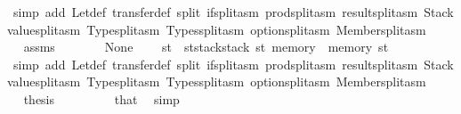 \begin{isabellebody}
\ {\isacharparenleft}{\kern0pt}simp\ add{\isacharcolon}{\kern0pt}\ Let{\isacharunderscore}{\kern0pt}def\ transfer{\isacharunderscore}{\kern0pt}def\ split{\isacharcolon}{\kern0pt}\ if{\isacharunderscore}{\kern0pt}split{\isacharunderscore}{\kern0pt}asm\ prod{\isachardot}{\kern0pt}split{\isacharunderscore}{\kern0pt}asm\ result{\isachardot}{\kern0pt}split{\isacharunderscore}{\kern0pt}asm\ Stackvalue{\isachardot}{\kern0pt}split{\isacharunderscore}{\kern0pt}asm\ Type{\isachardot}{\kern0pt}split{\isacharunderscore}{\kern0pt}asm\ Types{\isachardot}{\kern0pt}split{\isacharunderscore}{\kern0pt}asm\ option{\isachardot}{\kern0pt}split{\isacharunderscore}{\kern0pt}asm\ Member{\isachardot}{\kern0pt}split{\isacharunderscore}{\kern0pt}asm{\isacharparenright}{\kern0pt}\isanewline
\ \ \ \ \isamarkupfalse%
\ \isamarkupfalse%
\ assms\ {}\ {}\ {}\ {}\ {}\ {}\ {}\ None\ {}\ {}\ \isamarkupfalse%
\ {\isachardoublequoteopen}st{\isacharprime}{\kern0pt}\ {\isacharequal}{\kern0pt}\ st{\isacharprime}{\kern0pt}{\isacharprime}{\kern0pt}{\isasymlparr}stack{\isacharcolon}{\kern0pt}{\isacharequal}{\kern0pt}stack\ st{\isacharcomma}{\kern0pt}\ memory\ {\isacharcolon}{\kern0pt}{\isacharequal}{\kern0pt}\ memory\ st{\isasymrparr}{\isachardoublequoteclose}\ \isamarkupfalse%
\ {\isacharparenleft}{\kern0pt}simp\ add{\isacharcolon}{\kern0pt}\ Let{\isacharunderscore}{\kern0pt}def\ transfer{\isacharunderscore}{\kern0pt}def\ split{\isacharcolon}{\kern0pt}\ if{\isacharunderscore}{\kern0pt}split{\isacharunderscore}{\kern0pt}asm\ prod{\isachardot}{\kern0pt}split{\isacharunderscore}{\kern0pt}asm\ result{\isachardot}{\kern0pt}split{\isacharunderscore}{\kern0pt}asm\ Stackvalue{\isachardot}{\kern0pt}split{\isacharunderscore}{\kern0pt}asm\ Type{\isachardot}{\kern0pt}split{\isacharunderscore}{\kern0pt}asm\ Types{\isachardot}{\kern0pt}split{\isacharunderscore}{\kern0pt}asm\ option{\isachardot}{\kern0pt}split{\isacharunderscore}{\kern0pt}asm\ Member{\isachardot}{\kern0pt}split{\isacharunderscore}{\kern0pt}asm{\isacharparenright}{\kern0pt}\isanewline
\ \ \ \ \isamarkupfalse%
\ \isamarkupfalse%
\ {\isacharquery}{\kern0pt}thesis\ \isamarkupfalse%
\ {}\ {}\ {}\ {}\ {}\ {}\ {}\ that{\isacharparenleft}{\kern0pt}{}{\isacharparenright}{\kern0pt}\ \isamarkupfalse%
\ simp\isanewline

\end{isabellebody}
